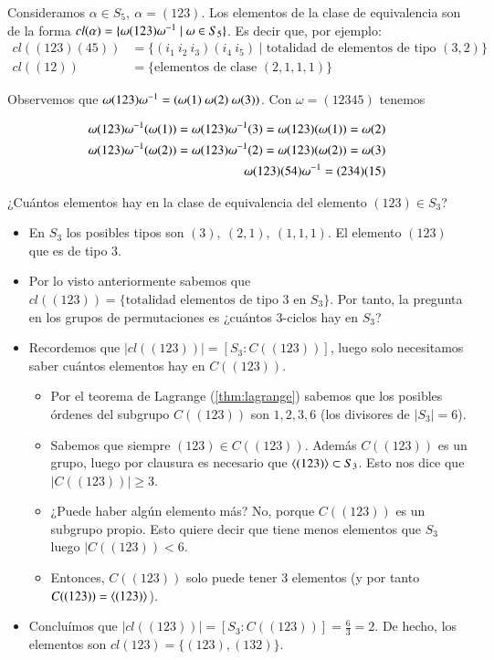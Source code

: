 \begin{ej}
	Consideramos $\alpha \in S_5,\ \alpha = (123)$. Los elementos de la clase de equivalencia son de la forma $cl(\alpha) = \{\omega (123) \omega^{-1} \mid \omega \in S_5\}$. Es decir que, por ejemplo:
	\begin{align*}
		cl((123)(45)) &= \{(i_1\ i_2\ i_3)(i_4\ i_5) \mid \text{totalidad de elementos de tipo } (3,2)\}\\
		cl((12)) &= \{\text{elementos de clase } (2,1,1,1)\}
	\end{align*}
	
	
	Observemos que $\omega (123) \omega^{-1} = (\omega(1)\ \omega(2)\ \omega(3))$. Con $\omega = (12345)$ tenemos
	
	\begin{align*}
		\omega(123)\omega^{-1}(\omega(1)) = \omega(123)\omega^{-1}(3) = \omega(123)(\omega(1)) = \omega(2)\\
		\omega(123)\omega^{-1}(\omega(2)) = \omega(123)\omega^{-1}(2) = \omega(123)(\omega(2)) = \omega(3) \\
		\omega(123)(54)\omega^{-1} = (234)(15)
	\end{align*}
\end{ej}

\begin{ej}¿Cuántos elementos hay en la clase de equivalencia del elemento $(123) \in S_3$?
	
\begin{itemize}
	\item En $S_3$ los posibles tipos son $(3),\ (2,1),\ (1,1,1)$. El elemento $(123)$ que es de tipo $3$. 
	\item Por lo visto anteriormente sabemos que $cl((123)) = \{\text{totalidad elementos de tipo 3 en } S_3\}$. Por tanto, la pregunta en los grupos de permutaciones es ¿cuántos 3-ciclos hay en $S_3$?
	\item Recordemos que $|cl((123))| = [S_3: C((123))]$, luego solo necesitamos saber cuántos elementos hay en $C((123))$.
	\begin{itemize}
		\item Por el teorema de Lagrange (\autoref{thm:lagrange}) sabemos que los posibles órdenes del subgrupo $C((123))$ son $1,2,3,6$ (los divisores de $|S_3| = 6$).
		\item Sabemos que siempre $(123) \in C((123))$. Además $C((123))$ es un grupo, luego por clausura es necesario que $\langle(123)\rangle \subset S_3$. Esto nos dice que $|C((123))| \geq 3$.
		\item ¿Puede haber algún elemento más? No, porque $C((123))$ es un subgrupo propio. Esto quiere decir que tiene menos elementos que $S_3$ luego $|C((123)) < 6$.
		\item Entonces, $C((123))$ solo puede tener 3 elementos (y por tanto $C((123)) = \langle(123)\rangle$).
	\end{itemize}
	\item Concluímos que $|cl((123))| = [S_3:C((123))] = \frac{6}{3} = 2$. De hecho, los elementos son $cl(123) = \{(123), (132)\}$.
\end{itemize}
\end{ej}

